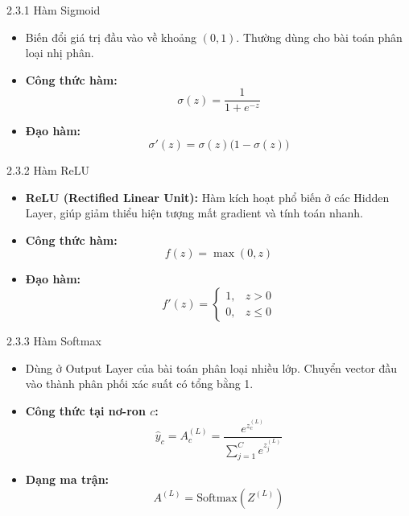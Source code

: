 \documentclass{beamer}
\begin{document}
\begin{frame}{2.3.1 Hàm Sigmoid}
  \begin{itemize}
    \item Biến đổi giá trị đầu vào về khoảng $(0,1)$. Thường dùng cho bài toán phân loại nhị phân.
    \item \textbf{Công thức hàm:}
    \begin{equation*}
        \sigma(z) = \frac{1}{1 + e^{-z}}
    \end{equation*}
    \item \textbf{Đạo hàm:}
    \begin{equation*}
        \sigma'(z) = \sigma(z)\bigl(1 - \sigma(z)\bigr)
    \end{equation*}
  \end{itemize}
\end{frame}

\begin{frame}{2.3.2 Hàm ReLU}
  \begin{itemize}
    \item \textbf{ReLU (Rectified Linear Unit):} Hàm kích hoạt phổ biến ở các Hidden Layer, giúp giảm thiểu hiện tượng mất gradient và tính toán nhanh.
    \item \textbf{Công thức hàm:}
    \begin{equation*}
        f(z) = \max(0, z)
    \end{equation*}
    \item \textbf{Đạo hàm:}
    \begin{equation*}
        f'(z) = \begin{cases} 1, & z > 0 \\ 0, & z \le 0 \end{cases}
    \end{equation*}
  \end{itemize}
\end{frame}

\begin{frame}{2.3.3 Hàm Softmax}
  \begin{itemize}
    \item Dùng ở Output Layer của bài toán phân loại nhiều lớp. Chuyển vector đầu vào thành phân phối xác suất có tổng bằng 1.
    \item \textbf{Công thức tại nơ-ron $c$:}
    \begin{equation*}
        \hat{y}_c = A^{(L)}_c = \frac{e^{z_c^{(L)}}}{\sum_{j=1}^C e^{z_j^{(L)}}}
    \end{equation*}
    \item \textbf{Dạng ma trận:}
    \begin{equation*}
        A^{(L)} = \mathrm{Softmax}\!\left(Z^{(L)}\right)
    \end{equation*}
  \end{itemize}
\end{frame}
\end{document}
